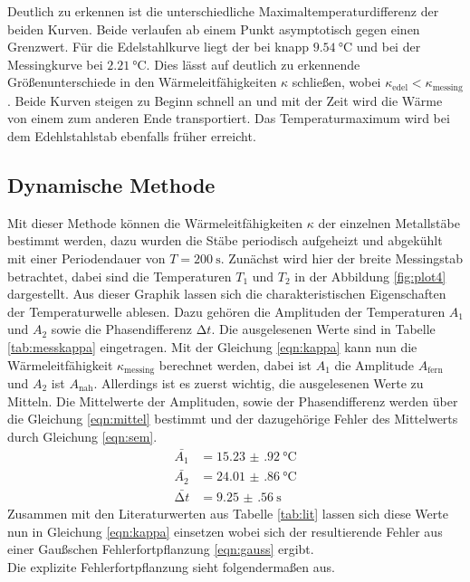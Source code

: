 Deutlich zu erkennen ist die unterschiedliche Maximaltemperaturdifferenz der beiden Kurven. Beide verlaufen ab einem Punkt asymptotisch gegen einen Grenzwert. Für die Edelstahlkurve liegt der bei knapp $\SI{9.54}{\celsius}$ und bei der 
Messingkurve bei $\SI{2.21}{\celsius}$. Dies lässt auf deutlich zu erkennende Größenunterschiede in den Wärmeleitfähigkeiten $\kappa$ schließen, wobei $\kappa_{\text{edel}} < \kappa_{\text{messing}}$. Beide Kurven steigen zu
Beginn schnell an und mit der Zeit wird die Wärme von einem zum anderen Ende transportiert. Das Temperaturmaximum wird bei dem Edehlstahlstab ebenfalls früher erreicht.

\subsection{Dynamische Methode}
Mit dieser Methode können die Wärmeleitfähigkeiten $\kappa$ der einzelnen Metallstäbe bestimmt werden, dazu wurden die Stäbe periodisch aufgeheizt und abgekühlt mit einer Periodendauer von $T = \SI{200}{\second}$.
Zunächst wird hier der breite Messingstab betrachtet, dabei sind die Temperaturen $T_{1}$ und $T_{2}$ in der Abbildung \ref{fig:plot4} dargestellt. Aus dieser Graphik lassen sich die charakteristischen Eigenschaften der Temperaturwelle
ablesen. Dazu gehören die Amplituden der Temperaturen $A_{1}$ und $A_{2}$ sowie die Phasendifferenz $\increment t$.
Die ausgelesenen Werte sind in Tabelle \ref{tab:messkappa} eingetragen. Mit der Gleichung \ref{eqn:kappa}
kann nun die Wärmeleitfähigkeit $\kappa_{\text{messing}}$ berechnet werden, dabei ist $A_{1}$ die Amplitude $A_{\text{fern}}$ und  $A_{2}$ ist $A_{\text{nah}}$.
Allerdings ist es zuerst wichtig, die ausgelesenen Werte zu Mitteln. Die Mittelwerte der Amplituden, sowie der Phasendifferenz werden über die Gleichung \ref{eqn:mittel} bestimmt und der dazugehörige Fehler des Mittelwerts durch
Gleichung \ref{eqn:sem}.
\begin{align}
\bar{A_{1}} &= \SI{15.23(92)}{\celsius}      \\
\bar{A_{2}} &=  \SI{24.01(86)}{\celsius}        \\
\bar{\increment t} &= \SI{9.25(56)}{\second}
\end{align}
Zusammen mit den Literaturwerten aus Tabelle \ref{tab:lit} lassen sich diese Werte nun in Gleichung \ref{eqn:kappa} einsetzen wobei sich der resultierende Fehler aus einer Gaußschen Fehlerfortpflanzung \ref{eqn:gauss} ergibt.
\begin{equation}

\end{equation}
Die explizite Fehlerfortpflanzung sieht folgendermaßen aus.